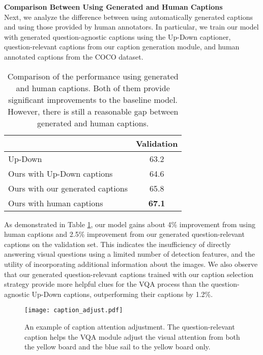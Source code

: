 \documentclass[11pt,a4paper]{article}
\begin{document}
\noindent\textbf{Comparison Between Using Generated and Human Captions}\\
Next, we analyze the difference between using automatically generated captions and using those provided by human annotators. 
In particular, we train our model with generated question-agnostic captions using the Up-Down \cite{anderson2017bottom} captioner, question-relevant captions from our caption generation module, and human annotated captions from the COCO dataset. 

\begin{table}[h]
\centering
\begin{tabular}{l|c}
\hline \toprule
                  & Validation \\ \hline
Up-Down \cite{anderson2017bottom} &  63.2\\
Ours with Up-Down captions &    64.6\\
Ours with our generated captions &    65.8\\
Ours with human captions &    \textbf{67.1} \\\bottomrule
\end{tabular}
\caption{Comparison of the performance using generated and human captions. Both of them provide significant improvements to the baseline model. However, there is still a reasonable gap between generated and human captions.}
\label{tab:gen_anno_compare}
\end{table}

As demonstrated in Table \ref{tab:gen_anno_compare}, our model gains about 4\% improvement from using human captions and 2.5\% improvement from our generated question-relevant captions on the validation set. This indicates the insufficiency of directly answering visual questions using a limited number of detection features, and the utility of incorporating additional information about the images. We also observe that our generated question-relevant captions trained with our caption selection strategy provide more helpful clues for the VQA process than the question-agnostic Up-Down captions, outperforming their captions by 1.2\%. \\



\begin{figure}[!h]
\centering
\texttt{[image: caption\_adjust.pdf]}
\caption{An example of caption attention adjustment. The question-relevant caption helps the VQA module adjust the visual attention from both the yellow board and the blue sail to the yellow board only. }
\label{fig:caption_adjust}
\end{figure}
\end{document}
